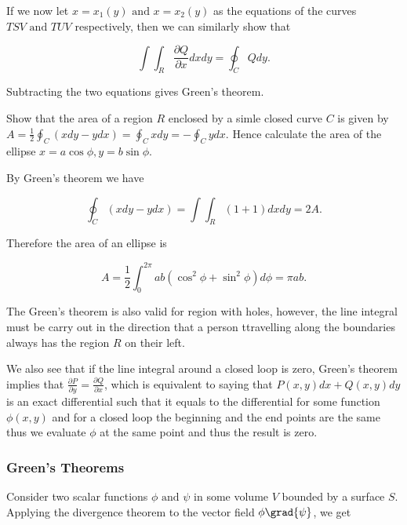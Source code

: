 \documentclass[english,a4paper,12pt]{report}
\begin{document}
If we now let \(x= x_1 (y) \text { and } x = x_2 (y)\) as the equations of the curves \(TSV \text { and } TUV\) respectively, then we can similarly show that 

\begin{equation}
	\int \int_{R}^{} \frac{\partial Q}{\partial x} dx dy = \oint_{C} Q dy.   
\end{equation}

Subtracting the two equations gives Green's theorem.

{Show that the area of a region \(R\) enclosed by a simle closed curve \(C\) is given by \(A = \frac{1}{2} \oint_{C}(xdy - ydx) = \oint_{C}xdy = - \oint_{C}y dx\). Hence calculate the area of the ellipse \(x = a \cos \phi , y = b\sin \phi \). }
{By Green's theorem we have 

\begin{equation} \label{area} 
	\oint_{C} (xdy- ydx) = \int \int_{R}^{} (1+1) dxdy = 2A.  
\end{equation}

Therefore the area of an ellipse is 

\begin{equation}
	A = \frac{1}{2} \int_{0}^{2\pi } ab(\cos ^2\phi + \sin ^2\phi ) d\phi  = \pi ab.   
\end{equation}
} 

The Green's theorem is also valid for region with holes, however, the line integral must be carry out in the direction that a person ttravelling along the boundaries always has the region \(R\) on their left.

We also see that if the line integral around a closed loop is zero, Green's theorem implies that \(\frac{\partial P}{\partial y} = \frac{\partial Q}{\partial x} \), which is equivalent to saying that \(P(x,y) dx + Q(x,y) dy \) is an exact differential such that it equals to the differential for some function \(\phi (x,y)\) and for a closed loop the beginning and the end points are the same thus we evaluate \(\phi \) at the same point and thus the result is zero.

\subsubsection{Green's Theorems}

Consider two scalar functions \(\phi \text { and } \psi \) in some volume \(V\) bounded by a surface \(S\). Applying the divergence theorem to the vector field \(\phi \grad{\psi } \), we get 
\end{document}
